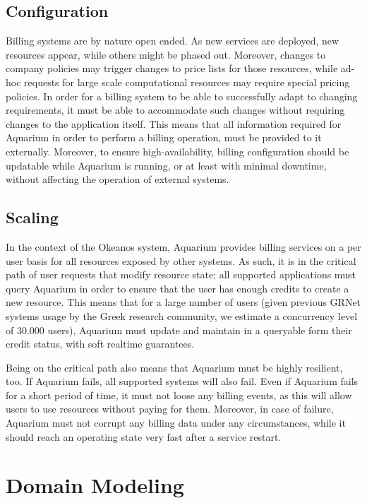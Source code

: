 \documentclass[preprint,10pt]{sigplanconf}
\begin{document}
\subsection{Configuration}

Billing systems are by nature open ended. As new services are deployed, new
resources appear, while others might be phased out.  Moreover, changes to
company policies may trigger changes to price lists for those resources, while
ad-hoc requests for large scale computational resources may require special
pricing policies. In order for a billing system to be able to successfully
adapt to changing requirements, it must be able to accommodate such changes
without requiring changes to the application itself. This means that all
information required for Aquarium in order to perform a billing operation,
must be provided to it externally. Moreover, to ensure high-availability,
billing configuration should be updatable while Aquarium is running, or at
least with minimal downtime, without affecting the operation of external
systems.


\subsection{Scaling}

In the context of the Okeanos system, Aquarium provides billing services on a
per user basis for all resources exposed by other systems. As such, it is in
the critical path of user requests that modify resource state; all supported
applications must query Aquarium in order to ensure that the user has enough
credits to create a new resource. This means that for a large number of users
(given previous GRNet systems usage by the Greek research community, we
estimate a concurrency level of 30.000 users), Aquarium must update and
maintain in a queryable form their credit status, 
with soft realtime guarantees. 

Being on the critical path also means that Aquarium must be highly resilient,
too. If Aquarium fails, all supported systems will also fail. Even if Aquarium
fails for a short period of time, it must not loose any billing events, as this
will allow users to use resources without paying for them. Moreover, in case of
failure, Aquarium must not corrupt any billing data under any circumstances,
while it should reach an operating state very fast after a service restart.

\section{Domain Modeling}
\end{document}
